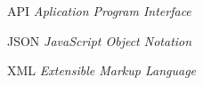 
%
%

\begin{siglas}
    \item[API]      \textit{Aplication Program Interface}
    \item[JSON]     \textit{JavaScript Object Notation}
    \item[XML]      \textit{Extensible Markup Language}
\end{siglas}
